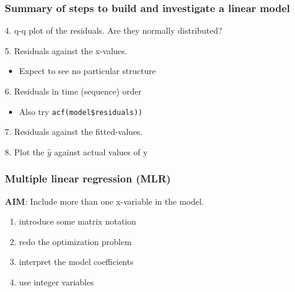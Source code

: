\begin{frame}\frametitle{Summary of steps to build and investigate a linear model}

	4. q-q plot of the residuals. Are they normally distributed?

	5. Residuals against the x-values.
	\begin{itemize}
		\item	Expect to see no particular structure
	\end{itemize}

	6. Residuals in time (sequence) order
	\begin{itemize}
		\item	Also try \texttt{acf(model\$residuals))}
	\end{itemize}

	7. Residuals against the fitted-values.

	8. Plot the $\hat{y}$ against actual values of y
\end{frame}

\begin{frame}\frametitle{Multiple linear regression (MLR)}

	\textbf{AIM}: Include more than one x-variable in the model.
	\begin{enumerate}
		\item	introduce some matrix notation
		\item	redo the optimization problem
		\item	interpret the model coefficients
		\item	use integer variables
	\end{enumerate}
\end{frame}

